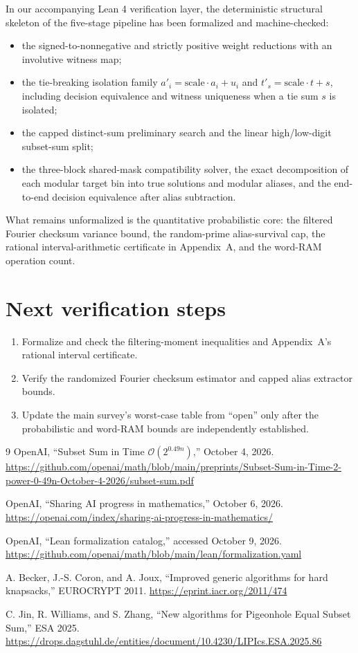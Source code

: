 \documentclass[11pt]{article}
\newcommand{\Oh}{\mathcal{O}}
\begin{document}
In our accompanying Lean 4 verification layer, the deterministic structural
skeleton of the five-stage pipeline has been formalized and machine-checked:
\begin{itemize}
\item the signed-to-nonnegative and strictly positive weight reductions with an
  involutive witness map;
\item the tie-breaking isolation family $a'_i = \text{scale}\cdot a_i + u_i$ and
  $t'_s = \text{scale}\cdot t + s$, including decision equivalence and witness
  uniqueness when a tie sum $s$ is isolated;
\item the capped distinct-sum preliminary search and the linear high/low-digit
  subset-sum split;
\item the three-block shared-mask compatibility solver, the exact decomposition
  of each modular target bin into true solutions and modular aliases, and the
  end-to-end decision equivalence after alias subtraction.
\end{itemize}
What remains unformalized is the quantitative probabilistic core: the
filtered Fourier checksum variance bound, the random-prime alias-survival cap,
the rational interval-arithmetic certificate in Appendix~A, and the word-RAM
operation count.

\section{Next verification steps}

\begin{enumerate}
\item Formalize and check the filtering-moment inequalities and Appendix~A's
  rational interval certificate.
\item Verify the randomized Fourier checksum estimator and capped alias
  extractor bounds.
\item Update the main survey's worst-case table from ``open'' only after the
  probabilistic and word-RAM bounds are independently established.
\end{enumerate}

\begin{thebibliography}{9}
OpenAI, ``Subset Sum in Time $\Oh(2^{0.49n})$,'' October 4, 2026.
\newblock \url{https://github.com/openai/math/blob/main/preprints/Subset-Sum-in-Time-2-power-0-49n-October-4-2026/subset-sum.pdf}

OpenAI, ``Sharing AI progress in mathematics,'' October 6, 2026.
\newblock \url{https://openai.com/index/sharing-ai-progress-in-mathematics/}

OpenAI, ``Lean formalization catalog,'' accessed October 9, 2026.
\newblock \url{https://github.com/openai/math/blob/main/lean/formalization.yaml}

A. Becker, J.-S. Coron, and A. Joux, ``Improved generic algorithms for hard
knapsacks,'' EUROCRYPT 2011.
\newblock \url{https://eprint.iacr.org/2011/474}

C. Jin, R. Williams, and S. Zhang, ``New algorithms for Pigeonhole Equal
Subset Sum,'' ESA 2025.
\newblock \url{https://drops.dagstuhl.de/entities/document/10.4230/LIPIcs.ESA.2025.86}
\end{thebibliography}
\end{document}
